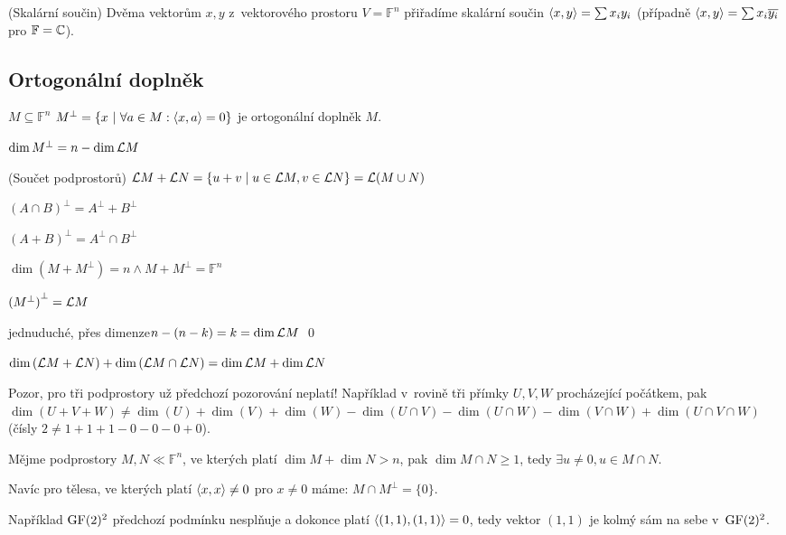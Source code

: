\df (Skalární součin) Dvěma vektorům $x,y$ z~vektorového prostoru $V = \mathbb{F}^n$
přiřadíme skalární součin ${\langle x,y\rangle} = \sum x_iy_i$ \quad(případně ${\langle x,y\rangle} = \sum
x_i\overline{y_i}$ pro $\mathbb{F} = \mathbb{C}$).

\subsection{Ortogonální doplněk}

\df $M \subseteq \mathbb{F}^n$ \quad $M^\bot = \{x\ |\ \forall a\in M: {\langle x,a\rangle} = 0\}$ je
ortogonální doplněk $M$.

\poz $\dim M^\bot = n - \dim \mathcal{L} M$

\df (Součet podprostorů) $\mathcal{L} M + \mathcal{L} N = \left\{ u + v \mid u \in \mathcal{L} M, v \in \mathcal{L} N \right\} = \mathcal{L}{(M\cup N)}$

\poz $(A \cap B)^\bot = A^\bot + B^\bot$

\poz $(A + B)^\bot = A^\bot \cap B^\bot$

\poz $\dim(M+M^\bot) = n \wedge M + M^\bot = \mathbb{F}^n$

\poz ${(M^\bot)}^\bot = \mathcal{L} M$

\dk \uv{$\supseteq$} jednuduché, \uv{$\subseteq$} přes dimenze\quad $n-(n-k) = k =
\dim \mathcal{L} M$ \qed

\poz $\dim\left(\mathcal{L} M + \mathcal{L} N\right) + \dim\left(\mathcal{L} M \cap \mathcal{L} N\right) = \dim \mathcal{L} M + \dim \mathcal{L} N$

Pozor, pro tři podprostory už předchozí pozorování neplatí! Například v~rovině tři
přímky $U,V,W$ procházející počátkem, pak $\dim(U + V + W) \neq \dim(U) + \dim(V) +
\dim(W) - \dim(U \cap V) - \dim(U \cap W) - \dim(V \cap W) + \dim(U \cap V \cap W)$
(čísly $2 \neq 1 + 1 + 1 - 0 - 0 - 0 + 0$).

\dsl Mějme podprostory $M,N \ll \mathbb{F}^n$, ve kterých platí $\dim M + \dim N > n$,
pak $\dim M \cap N \ge 1$, tedy $\exists u \neq 0, u \in M\cap N$.

\dsl Navíc pro tělesa, ve kterých platí ${\langle x,x\rangle} \neq 0$ pro $x\neq 0$ máme:  $M\cap
M^\bot = \{0\}$.

Například $\mathrm{GF}(2)^2$ předchozí podmínku nesplňuje a dokonce platí ${\langle (1,1), (1,1)\rangle} =
0$, tedy vektor $(1,1)$ je kolmý sám na sebe v~$\mathrm{GF}(2)^2$.

